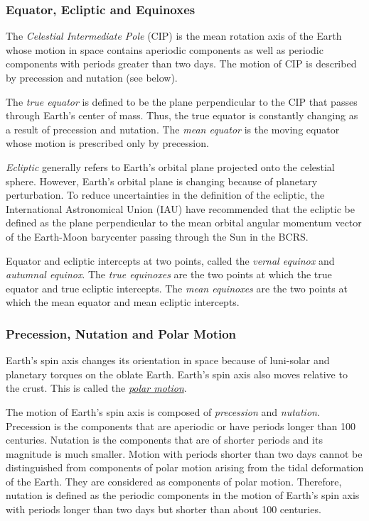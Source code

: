\documentclass[12pt]{article}
\begin{document}
\begin{CJK}{UTF8}{bkai}
\subsubsection{Equator, Ecliptic and Equinoxes} 

The {\em Celestial Intermediate Pole} (CIP) is the mean rotation axis of the Earth
whose motion in space contains aperiodic components as well as periodic
components with periods greater than two days. The motion of CIP is described
by precession and nutation (see below).

The {\em true equator} is defined to be the plane perpendicular to the CIP
that passes through Earth's center of mass. Thus, the true equator is constantly
changing as a result of precession and nutation. The {\em mean equator}
is the moving equator whose motion is prescribed only by precession.

{\em Ecliptic} generally refers to Earth's orbital plane projected onto the
celestial sphere. However, Earth's orbital plane is changing because of
planetary perturbation. To reduce uncertainties in the definition of the
ecliptic, the International Astronomical Union (IAU) have recommended that 
the ecliptic be defined as the plane
perpendicular to the mean orbital angular momentum vector of the Earth-Moon
barycenter passing through the Sun in the BCRS.

Equator and ecliptic intercepts at two points, called the {\em vernal equinox} and
{\em autumnal equinox}. The {\em true equinoxes} are the two points at which the true
equator and true ecliptic intercepts. The {\em mean equinoxes} are the two points
at which the mean equator and mean ecliptic intercepts.

\subsubsection{Precession, Nutation and Polar Motion}

Earth's spin axis changes its orientation in space because of
luni-solar and planetary torques on the oblate Earth.
Earth's spin axis also moves relative to the crust. This is called the
\href{https://en.wikipedia.org/wiki/Polar_motion}{\it polar motion}.

The motion of Earth's spin axis is composed of {\em precession} and {\em nutation}.
Precession is the components that are aperiodic or have periods longer
than 100 centuries. Nutation is the components that are of shorter periods
and its magnitude is much smaller. Motion with periods shorter than two days
cannot be distinguished from components of polar motion arising from the tidal
deformation of the Earth. They are considered as components of polar motion.
Therefore, nutation is defined as the periodic components in the motion of
Earth's spin axis with periods longer than two days but shorter than about 100 centuries.


\end{CJK}
\end{document}

